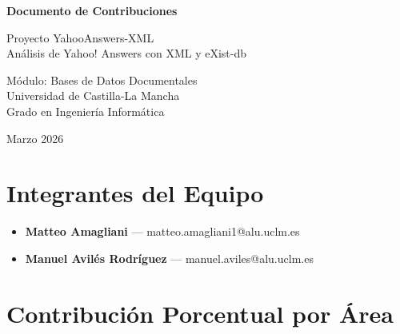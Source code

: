 \documentclass[11pt,a4paper]{article}
\begin{document}
\begin{center}
    {\LARGE \textbf{Documento de Contribuciones}}
    
    \vspace{0.5cm}
    {\large Proyecto YahooAnswers-XML}\\
    {\large An\'alisis de Yahoo! Answers con XML y eXist-db}
    
    \vspace{0.3cm}
    {\large M\'odulo: Bases de Datos Documentales}\\
    {\large Universidad de Castilla-La Mancha}\\
    {\large Grado en Ingenier\'ia Inform\'atica}
    
    \vspace{0.3cm}
    {\large Marzo 2026}
\end{center}

\vspace{1cm}

\section*{Integrantes del Equipo}

\begin{itemize}
    \item \textbf{Matteo Amagliani} --- matteo.amagliani1@alu.uclm.es
    \item \textbf{Manuel Avil\'es Rodr\'iguez} --- manuel.aviles@alu.uclm.es
\end{itemize}

\section*{Contribuci\'on Porcentual por \'Area}
\end{document}
